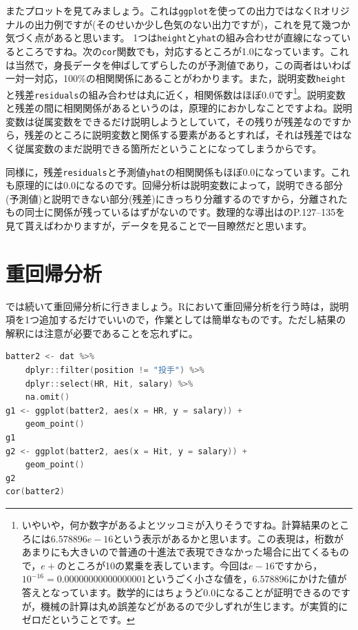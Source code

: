 \documentclass{ltjbook}
\begin{document}
またプロットを見てみましょう。これは\texttt{ggplot}を使っての出力ではなくRオリジナルの出力例ですが(そのせいか少し色気のない出力ですが)，これを見て幾つか気づく点があると思います。
1つは\verb|height|と\verb|yhat|の組み合わせが直線になっているところですね。次の\verb|cor|関数でも，対応するところが1.0になっています。これは当然で，身長データを伸ばしてずらしたのが予測値であり，この両者はいわば一対一対応，100\%の相関関係にあることがわかります。また，説明変数\verb|height|と残差\verb|residuals|の組み合わせは丸に近く，相関係数はほぼ0.0です\footnote{いやいや，何か数字があるよとツッコミが入りそうですね。計算結果のところには$6.578896e-16$という表示があるかと思います。この表現は，桁数があまりにも大きいので普通の十進法で表現できなかった場合に出てくるもので，$e+$のところが10の累乗を表しています。今回は$e-16$ですから，$10^{-16}=0.00000000000000001$というごく小さな値を，$6.578896$にかけた値が答えとなっています。数学的にはちょうど$0.0$になることが証明できるのですが，機械の計算は丸め誤差などがあるので少しずれが生じます。が実質的にゼロだということです。}。説明変数と残差の間に相関関係があるというのは，原理的におかしなことですよね。説明変数は従属変数をできるだけ説明しようとしていて，その残りが残差なのですから，残差のところに説明変数と関係する要素があるとすれば，それは残差ではなく従属変数のまだ説明できる箇所だということになってしまうからです。

同様に，残差\verb|residuals|と予測値\verb|yhat|の相関関係もほぼ0.0になっています。これも原理的には$0.0$になるのです。回帰分析は説明変数によって，説明できる部分(予測値)と説明できない部分(残差)にきっちり分離するのですから，分離されたもの同士に関係が残っているはずがないのです。数理的な導出は\citet{kosugi2018}のP.127--135を見て貰えばわかりますが，データを見ることで一目瞭然だと思います。
\section{重回帰分析}
では続いて重回帰分析に行きましょう。Rにおいて重回帰分析を行う時は，説明項を1つ追加するだけでいいので，作業としては簡単なものです。ただし結果の解釈には注意が必要であることを忘れずに。

\begin{lstlisting}[language=c++,label={code::11_06},caption={重回帰分析のデータを作って可視化}]
batter2 <- dat %>%
    dplyr::filter(position != "投手") %>%
    dplyr::select(HR, Hit, salary) %>%
    na.omit()
g1 <- ggplot(batter2, aes(x = HR, y = salary)) +
    geom_point()
g1
g2 <- ggplot(batter2, aes(x = Hit, y = salary)) +
    geom_point()
g2
cor(batter2)
\end{lstlisting}
\end{document}
